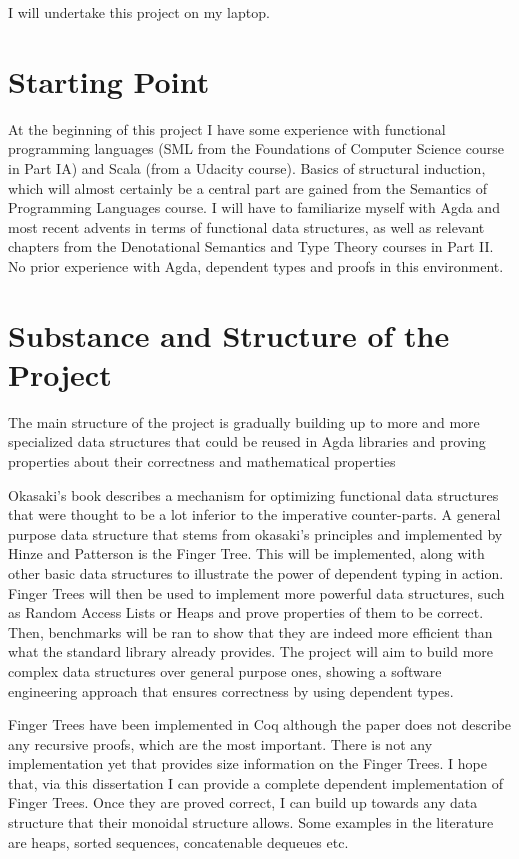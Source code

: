 \documentclass[12pt]{article}
\begin{document}
I will undertake this project on my laptop.

\section*{Starting Point}

At the beginning of this project I have some experience with functional programming
languages (SML from the Foundations of Computer Science course in Part IA) and Scala
(from a Udacity course). Basics of structural induction, which will almost certainly
be a central part are gained from the Semantics of Programming Languages course.
I will have to familiarize myself with Agda and most recent advents in terms of
functional data structures, as well as relevant chapters from the
Denotational Semantics and Type Theory courses in Part II.
No prior experience with Agda, dependent types and proofs in this environment.

\section*{Substance and Structure of the Project}

The main structure of the project is gradually building up to more and more
specialized data structures that could be reused in Agda libraries and proving
properties about their correctness and mathematical properties

Okasaki's book describes a mechanism for optimizing functional data structures
that were thought to be a lot inferior to the imperative counter-parts.
A general purpose data structure that stems from okasaki's principles and implemented
by Hinze and Patterson \cite{fingertree} is the Finger Tree.
This will be implemented, along with other basic data structures to
illustrate the power of dependent typing in action. Finger Trees will then be used
to implement more powerful data structures, such as Random Access Lists or
Heaps and prove properties of them to be correct. Then, benchmarks will be ran to
show that they are indeed more efficient than what the standard library already provides.
The project will aim to build more complex data structures over general
purpose ones, showing a software engineering approach that ensures correctness
by using dependent types.

Finger Trees have been implemented in Coq \cite{fingertrees} although the paper does not describe
any recursive proofs, which are the most important. There is not any implementation
yet that provides size information on the Finger Trees. I hope that, via this
dissertation I can provide a complete dependent implementation of Finger Trees.
Once they are proved correct, I can build up towards any data structure that
their monoidal structure allows. Some examples in the literature are heaps,
sorted sequences, concatenable dequeues etc.
\end{document}
